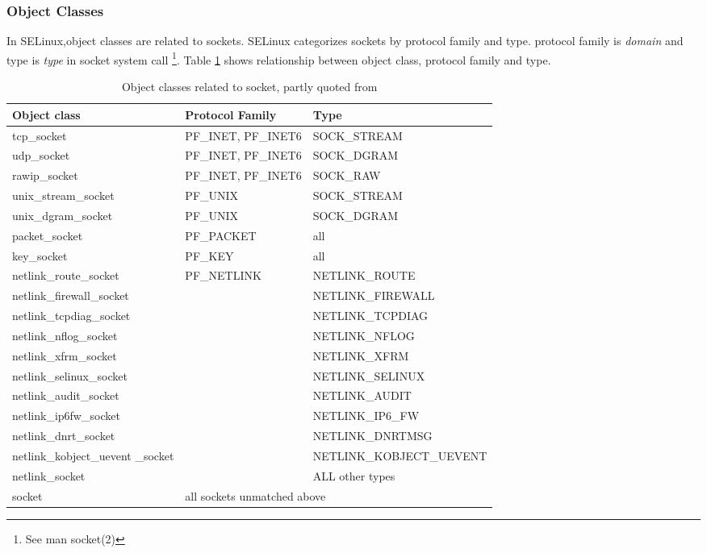 \documentclass{article}
\begin{document}
\subsubsection{Object Classes}
In SELinux,object classes are related to sockets. SELinux categorizes
sockets by protocol family and type. protocol family is {\it domain} and
type is {\it type } in socket system call \footnote{See man socket(2)}.
Table \ref{tab:objsock} shows relationship between object class,
protocol family and type. 
{\tiny
\begin{table}[h]
\caption{Object classes related to socket, partly quoted from \cite{selinuximplementation}}\label{tab:objsock}
\begin{center}
\begin{tabular}{|l|l|l|}
\hline
Object class & Protocol Family & Type \\
\hline
tcp\_socket & PF\_INET, PF\_INET6 &SOCK\_STREAM  \\
\hline
udp\_socket & PF\_INET, PF\_INET6 &SOCK\_DGRAM \\
\hline
rawip\_socket &  PF\_INET, PF\_INET6&SOCK\_RAW\\
\hline
 unix\_stream\_socket&PF\_UNIX & SOCK\_STREAM\\
\hline
 unix\_dgram\_socket&PF\_UNIX & SOCK\_DGRAM\\
\hline
 packet\_socket&PF\_PACKET & all \\
\hline
key\_socket & PF\_KEY & all  \\
\hline
netlink\_route\_socket & PF\_NETLINK & NETLINK\_ROUTE \\
\cline{1-1}\cline{3-3}
 netlink\_firewall\_socket&  &NETLINK\_FIREWALL  \\
\cline{1-1}\cline{3-3}
netlink\_tcpdiag\_socket & & NETLINK\_TCPDIAG \\
\cline{1-1}\cline{3-3}
netlink\_nflog\_socket& & NETLINK\_NFLOG  \\
\cline{1-1}\cline{3-3}
netlink\_xfrm\_socket& &  NETLINK\_XFRM  \\
\cline{1-1}\cline{3-3}
netlink\_selinux\_socket& & NETLINK\_SELINUX  \\
\cline{1-1}\cline{3-3}
netlink\_audit\_socket& & NETLINK\_AUDIT  \\
\cline{1-1}\cline{3-3}
netlink\_ip6fw\_socket& &  NETLINK\_IP6\_FW  \\
\cline{1-1}\cline{3-3}
netlink\_dnrt\_socket & & NETLINK\_DNRTMSG  \\
\cline{1-1}\cline{3-3}
netlink\_kobject\_uevent \_socket& & NETLINK\_KOBJECT\_UEVENT \\
\cline{1-1}\cline{3-3}
netlink\_socket& &ALL other types  \\
\hline
socket & \multicolumn{2}{|l|}{all sockets unmatched above}\\ 
\hline
\end{tabular}
\end{center}
\end{table}
}
\end{document}
